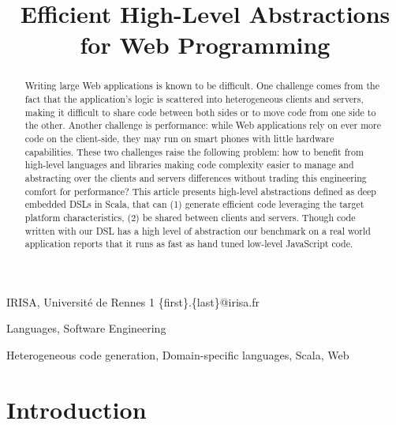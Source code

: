\documentclass[preprint]{sigplanconf}
\begin{document}
\copyrightdata{[to be supplied]} 


\title{Efficient High-Level Abstractions for Web Programming}

           {IRISA, Université de Rennes 1}
           {\{first\}.\{last\}@irisa.fr}

\maketitle

\begin{abstract}
Writing large Web applications is known to be difficult. One challenge comes from the fact that the
application's logic is scattered into heterogeneous clients and servers, making it difficult to
share code between both sides or to move code from one side to the other. Another challenge is
performance: while Web applications rely on ever more code on the client-side, they may run on smart
phones with little hardware capabilities. These two challenges raise the following problem: how to
benefit from high-level languages and libraries making code complexity easier to manage and
abstracting over the clients and servers differences without trading this engineering comfort for
performance? This article presents high-level abstractions defined as deep embedded DSLs in Scala,
that can (1) generate efficient code leveraging the target platform characteristics, (2) be shared
between clients and servers. Though code written with our DSL has a high level of abstraction our
benchmark on a real world application reports that it runs as fast as hand tuned low-level
JavaScript code.
\end{abstract}


\terms Languages, Software Engineering

\keywords Heterogeneous code generation, Domain-specific languages, Scala, Web

\section{Introduction}
\end{document}
